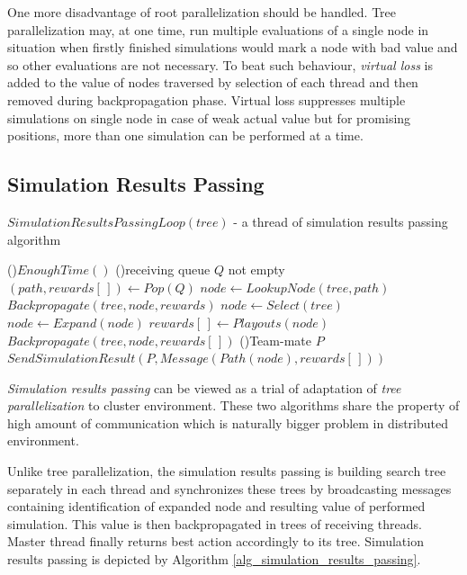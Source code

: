 One more disadvantage of root parallelization should be handled. Tree parallelization may, at
one time, run multiple evaluations of a single node in situation when firstly finished
simulations would mark a node with bad value and so other evaluations are not necessary. To
beat such behaviour, \emph{virtual loss} is added to the value of nodes traversed by selection
of each thread and then removed during backpropagation phase. Virtual loss suppresses multiple
simulations on single node in case of weak actual value but for promising positions, more than
one simulation can be performed at a time.



\subsection{Simulation Results Passing}
\label{sec_simulation_passing}

\begin{algorithm}
\DontPrintSemicolon
\caption{$SimulationResultsPassingLoop(tree)$ - a thread of simulation results passing
algorithm}
\label{alg_simulation_results_passing}

\While(){$EnoughTime()$}{
    \While(){receiving queue $Q$ not empty}{
        $(path,rewards[\,]) \leftarrow Pop(Q)$ \;
        $node \leftarrow LookupNode(tree,path)$ \;
        $Backpropagate(tree,node,rewards)$ \;
    }
    $node \leftarrow Select(tree)$\;
    $node \leftarrow Expand(node)$\;
    $rewards[\,] \leftarrow Playouts(node)$\;
    $Backpropagate(tree,node,rewards[\,])$ \;
    \ForEach(){Team-mate $P$}{
        $SendSimulationResult(P, Message(Path(node),rewards[\,]))$ \;
    }
}

 \;
\end{algorithm}



\emph{Simulation results passing} can be viewed as a trial of adaptation of \emph{tree
parallelization} to cluster environment. These two algorithms share the property of high amount of
communication which is naturally bigger problem in distributed environment.

Unlike tree parallelization, the simulation results passing is building search tree separately in
each thread and synchronizes these trees by broadcasting messages containing identification of
expanded node and resulting value of performed simulation. This value is then backpropagated in
trees of receiving threads. Master thread finally returns best action accordingly to its tree.
Simulation results passing is depicted by Algorithm \ref{alg_simulation_results_passing}.

